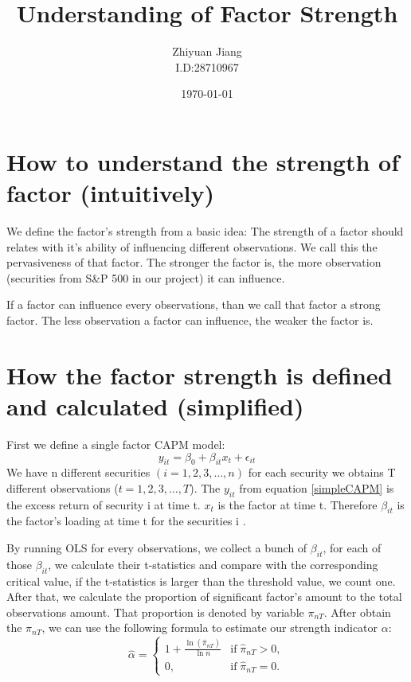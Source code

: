 \documentclass[12pt]{article}
\title{Understanding of Factor Strength}
\author{Zhiyuan Jiang\\I.D:28710967}
\date{\today}
\begin{document}
	\maketitle	
		\section{How to understand the strength of factor (intuitively)}
We define the factor's strength from a basic idea: The strength of a factor should relates with it's ability of influencing different observations. We call this the pervasiveness of that factor. The stronger the factor is, the more observation (securities from S\&P 500 in our project) it can influence. 

If a factor can influence every observations, than we call that factor a strong factor. The less observation a factor can influence, the weaker the factor is. 

	\section{How the factor strength is defined and calculated (simplified)}
First we define a single factor CAPM model:
\[  y_{it} = \beta_0 + \beta_{it}x_t + \epsilon_{it}  \tag{1}\label{simpleCAPM} \]
We have n different securities $(i = 1, 2, 3, \dots , n)$ for each security we obtains T different observations ($t = 1, 2, 3, \dots, T$). The $y_{it}$ from equation \eqref{simpleCAPM} is the excess return of security i at time t. $x_t$ is the factor at time t. Therefore $\beta_{it}$ is the factor's loading at time t for the securities i .

By running OLS for every observations, we collect a bunch of $\beta_{it}$, for each of those $\beta_{it}$, we calculate their t-statistics and compare with the corresponding critical value, if the t-statistics is larger than the threshold value, we count one. After that, we calculate the proportion of significant factor's amount to the total observations amount. That proportion is denoted by variable $\pi_{nT} $. After obtain the $\pi_{nT}$, we can use the following formula to estimate our strength indicator $\alpha$:
\[ \hat{\alpha} = \begin{cases}
1+\frac{\ln(\hat{\pi}_{nT})}{\ln n} & \text{if}\; \hat{\pi}_{nT} > 0,\\
	0, & \text{if}\; \hat{\pi}_{nT} = 0.
\end{cases} \]
\end{document}
